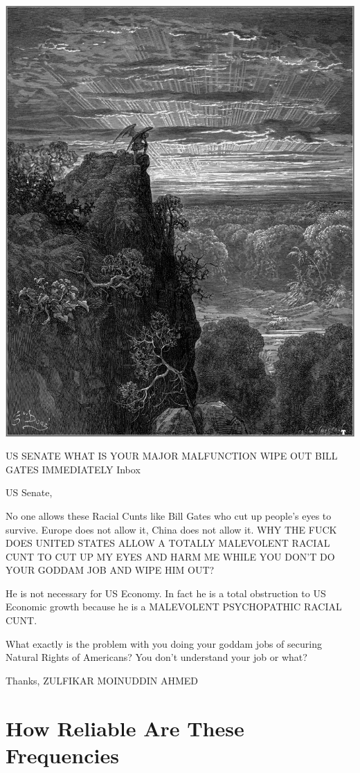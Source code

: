 \documentclass{amsart}
\begin{document}
\includegraphics[scale=0.4]{over.jpg}

US SENATE WHAT IS YOUR MAJOR MALFUNCTION WIPE OUT BILL GATES IMMEDIATELY
Inbox


US Senate,

No one allows these Racial Cunts like Bill Gates who cut up people's eyes to survive.  Europe does not allow it, China does not allow it.  WHY THE FUCK DOES UNITED STATES ALLOW A TOTALLY MALEVOLENT RACIAL CUNT TO CUT UP MY EYES AND HARM ME WHILE YOU DON'T DO YOUR GODDAM JOB AND WIPE HIM OUT?

He is not necessary for US Economy.  In fact he is a total obstruction to US Economic growth because he is a MALEVOLENT PSYCHOPATHIC RACIAL CUNT. 

What exactly is the problem with you doing your goddam jobs of securing Natural Rights of Americans?  You don't understand your job or what?

Thanks,
ZULFIKAR MOINUDDIN AHMED

\section{How Reliable Are These Frequencies}
\end{document}
